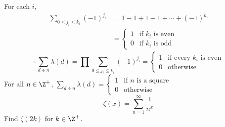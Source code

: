 For each $i$,
\begin{align*}
\sum_{0\leq j_i\leq k_i}(-1)^{j_i} &= 1-1+1-1+\dotsb+(-1)^{k_i} \\
&= \begin{cases}
1 & \text{if $k_i$ is even} \\
0 & \text{if $k_i$ is odd}
\end{cases}
\end{align*}
\[ \therefore \sum_{d\div n}\lambda(d) = \prod \sum_{0\leq j_i\leq k_i}(-1)^{j_i} = \begin{cases}
1 & \text{if every $k_i$ is even} \\
0 & \text{otherwise}
\end{cases} \]
For all $n\in\Z^+$, $\sum_{d\div n}\lambda(d)=\begin{cases}
1 & \text{if $n$ is a square} \\
0 & \text{otherwise}
\end{cases}$
\[ \zeta(x) = \sum_{n=1}^\infty \frac{1}{n^x} \]
Find $\zeta(2k)$ for $k\in\Z^+$.

